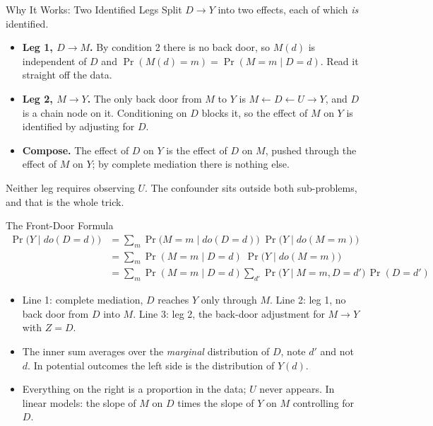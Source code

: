 \documentclass[aspectratio=169,11pt,xcolor=dvipsnames]{beamer}
\newcommand{\adv}{\,\raisebox{0.6pt}{\textcolor{accent}{$\bigstar$}}}
\begin{document}
\begin{frame}{Why It Works: Two Identified Legs}
Split $D \to Y$ into two effects, each of which \emph{is} identified.
\begin{itemize}\itemsep4pt
  \item \textbf{Leg 1, $D \to M$.} By condition 2 there is no back door, so
        $M(d)$ is independent of $D$ and $\Pr(M(d) = m) = \Pr(M = m \mid D = d)$.
        Read it straight off the data.
  \item \textbf{Leg 2, $M \to Y$.} The only back door from $M$ to $Y$ is
        $M \leftarrow D \leftarrow U \to Y$, and $D$ is a chain node on it.
        Conditioning on $D$ blocks it, so the effect of $M$ on $Y$ is
        identified by adjusting for $D$.
  \item \textbf{Compose.} The effect of $D$ on $Y$ is the effect of $D$ on
        $M$, pushed through the effect of $M$ on $Y$; by complete mediation
        there is nothing else.
\end{itemize}
\vskip4pt
\alert{Neither leg requires observing $U$.} The confounder sits outside both
sub-problems, and that is the whole trick.
\end{frame}

\begin{frame}{The Front-Door Formula\adv}
\begingroup\small
\begin{align*}
  \Pr\big(Y \mid do(D = d)\big)
  &= \sum_m \Pr\big(M = m \mid do(D = d)\big)\;\Pr\big(Y \mid do(M = m)\big) \\
  &= \sum_m \Pr(M = m \mid D = d)\;\Pr\big(Y \mid do(M = m)\big) \\
  &= \sum_m \Pr(M = m \mid D = d)
     \sum_{d'} \Pr\big(Y \mid M = m, D = d'\big)\,\Pr(D = d')
\end{align*}
\endgroup
\begin{itemize}\itemsep1pt
  \item Line 1: complete mediation, $D$ reaches $Y$ only through $M$.
        Line 2: leg 1, no back door from $D$ into $M$. Line 3: leg 2, the
        back-door adjustment for $M \to Y$ with $Z = D$.
  \item The inner sum averages over the \emph{marginal} distribution of $D$,
        note $d'$ and not $d$. In potential outcomes the left side is the
        distribution of $Y(d)$.
  \item Everything on the right is a proportion in the data; $U$ never
        appears. In linear models: the slope of $M$ on $D$ times the slope
        of $Y$ on $M$ controlling for $D$.
\end{itemize}
\end{frame}
\end{document}
